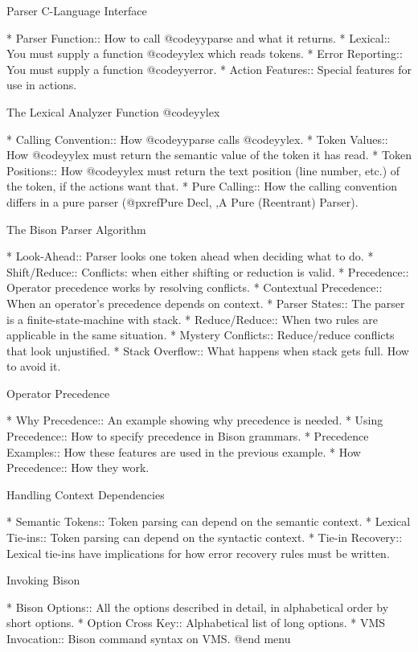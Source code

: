 Parser C-Language Interface

* Parser Function::   How to call @code{yyparse} and what it returns.
* Lexical::           You must supply a function @code{yylex} 
                        which reads tokens.
* Error Reporting::   You must supply a function @code{yyerror}.
* Action Features::   Special features for use in actions.

The Lexical Analyzer Function @code{yylex}

* Calling Convention::  How @code{yyparse} calls @code{yylex}.
* Token Values::      How @code{yylex} must return the semantic value
                        of the token it has read.
* Token Positions::   How @code{yylex} must return the text position
                        (line number, etc.) of the token, if the
                         actions want that.
* Pure Calling::      How the calling convention differs
                        in a pure parser (@pxref{Pure Decl, ,A Pure (Reentrant) Parser}).

The Bison Parser Algorithm 

* Look-Ahead::        Parser looks one token ahead when deciding what to do.
* Shift/Reduce::      Conflicts: when either shifting or reduction is valid.
* Precedence::        Operator precedence works by resolving conflicts.
* Contextual Precedence::  When an operator's precedence depends on context.
* Parser States::     The parser is a finite-state-machine with stack.
* Reduce/Reduce::     When two rules are applicable in the same situation.
* Mystery Conflicts::  Reduce/reduce conflicts that look unjustified.
* Stack Overflow::    What happens when stack gets full.  How to avoid it.

Operator Precedence

* Why Precedence::    An example showing why precedence is needed.
* Using Precedence::  How to specify precedence in Bison grammars.
* Precedence Examples::  How these features are used in the previous example.
* How Precedence::    How they work.

Handling Context Dependencies

* Semantic Tokens::   Token parsing can depend on the semantic context.
* Lexical Tie-ins::   Token parsing can depend on the syntactic context.
* Tie-in Recovery::   Lexical tie-ins have implications for how
                        error recovery rules must be written.

Invoking Bison

* Bison Options::     All the options described in detail, 
			in alphabetical order by short options.
* Option Cross Key::  Alphabetical list of long options.
* VMS Invocation::    Bison command syntax on VMS.
@end menu

